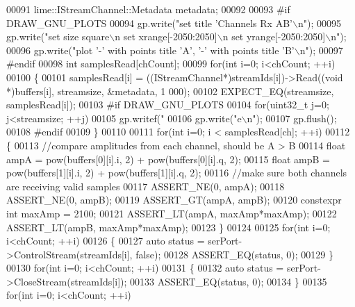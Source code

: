 \begin{DoxyCode}
00091     lime::IStreamChannel::Metadata metadata;
00092 
00093 \textcolor{preprocessor}{#if DRAW\_GNU\_PLOTS}
00094     gp.write(\textcolor{stringliteral}{"set title 'Channels Rx AB'\(\backslash\)n"});
00095     gp.write(\textcolor{stringliteral}{"set size square\(\backslash\)n set xrange[-2050:2050]\(\backslash\)n set yrange[-2050:2050]\(\backslash\)n"});
00096     gp.write(\textcolor{stringliteral}{"plot '-' with points title 'A', '-' with points title 'B'\(\backslash\)n"});
00097 \textcolor{preprocessor}{#endif}
00098     \textcolor{keywordtype}{int} samplesRead[chCount];
00099     \textcolor{keywordflow}{for}(\textcolor{keywordtype}{int} i=0; i<chCount; ++i)
00100     \{
00101         samplesRead[i] = ((IStreamChannel*)streamIds[i])->Read((\textcolor{keywordtype}{void} *)buffers[i], streamsize, &metadata, 1
      000);
00102         EXPECT\_EQ(streamsize, samplesRead[i]);
00103 \textcolor{preprocessor}{#if DRAW\_GNU\_PLOTS}
00104         \textcolor{keywordflow}{for}(uint32\_t j=0; j<streamsize; ++j)
00105             gp.writef(\textcolor{stringliteral}{"%
00106         gp.write(\textcolor{stringliteral}{"e\(\backslash\)n"});
00107         gp.flush();
00108 \textcolor{preprocessor}{#endif}
00109     \}
00110 
00111     \textcolor{keywordflow}{for}(\textcolor{keywordtype}{int} i=0; i < samplesRead[ch]; ++i)
00112     \{
00113         \textcolor{comment}{//compare amplitudes from each channel, should be A > B}
00114         \textcolor{keywordtype}{float} ampA = pow(buffers[0][i].i, 2) + pow(buffers[0][i].q, 2);
00115         \textcolor{keywordtype}{float} ampB = pow(buffers[1][i].i, 2) + pow(buffers[1][i].q, 2);
00116         \textcolor{comment}{//make sure both channels are receiving valid samples}
00117         ASSERT\_NE(0, ampA);
00118         ASSERT\_NE(0, ampB);
00119         ASSERT\_GT(ampA, ampB);
00120         constexpr \textcolor{keywordtype}{int} maxAmp = 2100;
00121         ASSERT\_LT(ampA, maxAmp*maxAmp);
00122         ASSERT\_LT(ampB, maxAmp*maxAmp);
00123     \}
00124 
00125     \textcolor{keywordflow}{for}(\textcolor{keywordtype}{int} i=0; i<chCount; ++i)
00126     \{
00127         \textcolor{keyword}{auto} status = serPort->ControlStream(streamIds[i], \textcolor{keyword}{false});
00128         ASSERT\_EQ(status, 0);
00129     \}
00130     \textcolor{keywordflow}{for}(\textcolor{keywordtype}{int} i=0; i<chCount; ++i)
00131     \{
00132         \textcolor{keyword}{auto} status = serPort->CloseStream(streamIds[i]);
00133         ASSERT\_EQ(status, 0);
00134     \}
00135     \textcolor{keywordflow}{for}(\textcolor{keywordtype}{int} i=0; i<chCount; ++i)
}
\end{DoxyCode}
